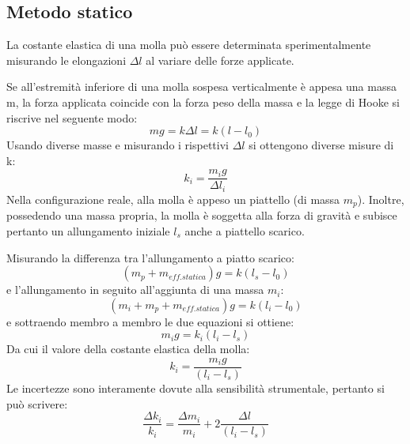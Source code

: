 \documentclass[a4paper,12pt]{article}
\begin{document}
\subsection{Metodo statico}
La costante elastica di una molla può essere determinata sperimentalmente misurando
le elongazioni $\Delta l$ al variare delle forze applicate.

Se all'estremità inferiore di una molla sospesa verticalmente è appesa una massa m,
la forza applicata coincide con la forza peso della massa e la legge di Hooke si riscrive
nel seguente modo:
$$
mg = k {\Delta l} = k (l-l_0)
$$
Usando diverse masse e misurando i rispettivi $\Delta l$ si ottengono diverse misure di k:
$$
k_i = \frac{m_i g}{\Delta l_i}
$$
Nella configurazione reale, alla molla è appeso un piattello (di massa $m_p$).
Inoltre, possedendo una massa propria, la molla è soggetta alla forza di gravità e subisce pertanto un allungamento iniziale $l_s$ anche a piattello scarico.

Misurando la differenza tra l'allungamento a piatto scarico:
$$
(m_p + m_{eff.statica})g = k(l_s - l_0)
$$
e l'allungamento in seguito all'aggiunta di una massa $m_i$:
$$
(m_i + m_p + m_{eff.statica})g = k(l_i - l_0)
$$
e sottraendo membro a membro le due equazioni si ottiene:
$$
m_i g = k_i (l_i - l_s)
$$
Da cui il valore della costante elastica della molla:
$$
k_i = \frac{m_i g}{(l_i - l_s)}
$$
Le incertezze sono interamente dovute alla sensibilità strumentale, pertanto si può scrivere:
$$
\frac{\Delta k_i}{k_i} = \frac{\Delta m_i}{m_i}+2\frac{\Delta l}{(l_i - l_s)}
$$
\end{document}

